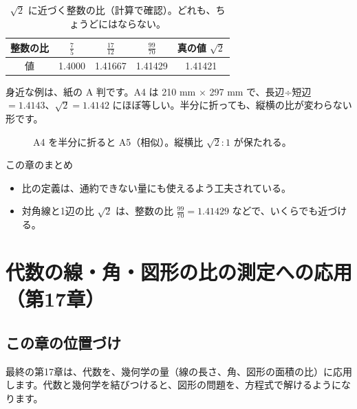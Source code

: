 \documentclass[a4paper,11pt,openany]{ltjsbook}
\begin{document}
\begin{table}[htbp]
\centering
\begin{tabular}{c|cccc}
\toprule
整数の比 & $\tfrac75$ & $\tfrac{17}{12}$ & $\tfrac{99}{70}$ & 真の値 $\sqrt2$\\
\midrule
値 & 1.4000 & 1.41667 & 1.41429 & 1.41421\\
\bottomrule
\end{tabular}
\caption{$\sqrt2$ に近づく整数の比（計算で確認）。どれも、ちょうどにはならない。}
\end{table}

身近な例は、紙の A 判です。A4 は 210 mm $\times$ 297 mm で、長辺÷短辺 $=1.4143$、$\sqrt2=1.4142$ にほぼ等しい。半分に折っても、縦横の比が変わらない形です。

\begin{figure}[htbp]
\centering
{}
\caption{A4 を半分に折ると A5（相似）。縦横比 $\sqrt2:1$ が保たれる。}
\end{figure}

\begin{pointbox}{この章のまとめ}
\begin{itemize}[leftmargin=*]
\item 比の定義は、通約できない量にも使えるよう工夫されている。
\item 対角線と1辺の比 $\sqrt2$ は、整数の比 $\tfrac{99}{70}=1.41429$ などで、いくらでも近づける。
\end{itemize}
\end{pointbox}

\chapter{代数の線・角・図形の比の測定への応用（第17章）}

\section{この章の位置づけ}

最終の第17章は、代数を、幾何学の量（線の長さ、角、図形の面積の比）に応用します。代数と幾何学を結びつけると、図形の問題を、方程式で解けるようになります。
\end{document}
